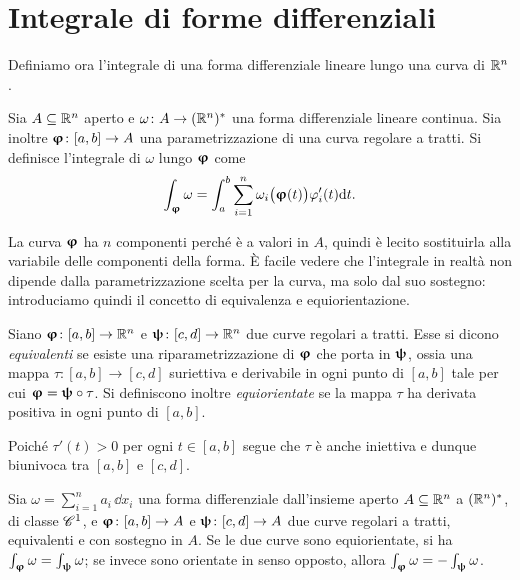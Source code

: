 \section{Integrale di forme differenziali}
Definiamo ora l'integrale di una forma differenziale lineare lungo una curva di $\R^n$.
\begin{definizione} \label{d:integrale-1forma}
	Sia $A\subseteq\R^n$ aperto e $\omega\colon A\to(\R^n)^*$ una forma differenziale lineare continua.
	Sia inoltre $\vphi\colon[a,b]\to A$ una parametrizzazione di una curva regolare a tratti.
	Si definisce l'integrale di $\omega$ lungo $\vphi$ come
	\begin{equation} 
		\int_{\vphi}\omega=\int_a^b\sum_{i=1}^n\omega_i\big(\vphi(t)\big)\phi_i'(t)\dd t.
		\label{eq:integrale-1forma}
	\end{equation}
\end{definizione}
	La curva $\vphi$ ha $n$ componenti perch\'e è a valori in $A$, quindi è lecito sostituirla alla variabile delle componenti della forma.
	È facile vedere che l'integrale in realtà non dipende dalla parametrizzazione scelta per la curva, ma solo dal suo sostegno: introduciamo quindi il concetto di equivalenza e equiorientazione.
\begin{definizione}
	Siano $\vphi\colon[a,b]\to\R^n$ e $\vpsi\colon[c,d]\to\R^n$ due curve regolari a tratti.
	Esse si dicono \emph{equivalenti} se esiste una riparametrizzazione di $\vphi$ che porta in $\vpsi$, ossia una mappa $\tau\colon[a,b]\to[c,d]$ suriettiva e derivabile in ogni punto di $[a,b]$ tale per cui $\vphi=\vpsi\circ\tau$. 
	Si definiscono inoltre \emph{equiorientate} se la mappa $\tau$ ha derivata positiva in ogni punto di $[a,b]$.
\end{definizione}
Poiché $\tau'(t)>0$ per ogni $t\in[a,b]$ segue che $\tau$ è anche iniettiva e dunque biunivoca tra $[a,b]$ e $[c,d]$.
\begin{teorema}
	Sia $\omega=\sum_{i=1}^na_i\,\dd x_i$ una forma differenziale dall'insieme aperto $A\subseteq\R^n$ a $(\R^n)^*$, di classe $\cclass[1]$, e $\vphi\colon[a,b]\to A$ e $\vpsi\colon [c,d]\to A$ due curve regolari a tratti, equivalenti e con sostegno in $A$.
	Se le due curve sono equiorientate, si ha $\int_{\vphi}\omega=\int_{\vpsi}\omega$; se invece sono orientate in senso opposto, allora $\int_{\vphi}\omega=-\int_{\vpsi}\omega$.
\end{teorema}
